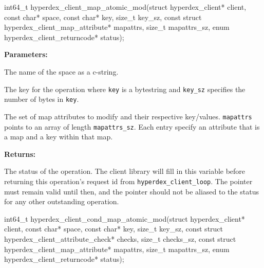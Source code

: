 \funcsep
{}
\begin{ccode}
int64_t hyperdex_client_map_atomic_mod(struct hyperdex_client* client,
                const char* space,
                const char* key, size_t key_sz,
                const struct hyperdex_client_map_attribute* mapattrs, size_t mapattrs_sz,
                enum hyperdex_client_returncode* status);
\end{ccode}
\funcdesc 

\noindent\textbf{Parameters:}
\begin{description}[labelindent=\widthof{{\texttt{mapattrs}, \texttt{mapattrs\_sz}}},leftmargin=*,noitemsep,nolistsep,align=right]
\item[\texttt{space}] The name of the space as a c-string.
\item[\texttt{key}, \texttt{key\_sz}] The key for the operation where \texttt{key} is a bytestring and \texttt{key\_sz} specifies the number of bytes in \texttt{key}.
\item[\texttt{mapattrs}, \texttt{mapattrs\_sz}] The set of map attributes to modify and their respective key/values.  \texttt{mapattrs} points to an array of length \texttt{mapattrs\_sz}.  Each entry specify an attribute that is a map and a key within that map.
\end{description}

\noindent\textbf{Returns:}
\begin{description}[labelindent=\widthof{{\texttt{status}}},leftmargin=*,noitemsep,nolistsep,align=right]
\item[\texttt{status}] The status of the operation.  The client library will fill in this variable before returning this operation's request id from \texttt{hyperdex\_client\_loop}.  The pointer must remain valid until then, and the pointer should not be aliased to the status for any other outstanding operation.
\end{description}

\funcsep
{}
\begin{ccode}
int64_t hyperdex_client_cond_map_atomic_mod(struct hyperdex_client* client,
                const char* space,
                const char* key, size_t key_sz,
                const struct hyperdex_client_attribute_check* checks, size_t checks_sz,
                const struct hyperdex_client_map_attribute* mapattrs, size_t mapattrs_sz,
                enum hyperdex_client_returncode* status);
\end{ccode}
\funcdesc 

